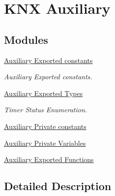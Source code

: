 \hypertarget{group___k_n_x___aux}{}\section{K\+NX Auxiliary}
\label{group___k_n_x___aux}
\subsection*{Modules}
\begin{DoxyCompactItemize}
\item 
\hyperlink{group___k_n_x___aux___exported___consts}{Auxiliary Exported constants}
\begin{DoxyCompactList}\small\item\em Auxiliary Exported constants. \end{DoxyCompactList}\item 
\hyperlink{group___k_n_x___aux___exported___types}{Auxiliary Exported Types}
\begin{DoxyCompactList}\small\item\em Timer Status Enumeration. \end{DoxyCompactList}\item 
\hyperlink{group___k_n_x___aux___private___consts}{Auxiliary Private constants}
\item 
\hyperlink{group___k_n_x___aux___private___variables}{Auxiliary Private Variables}
\item 
\hyperlink{group___k_n_x___aux___exported___functions}{Auxiliary Exported Functions}
\end{DoxyCompactItemize}


\subsection{Detailed Description}
